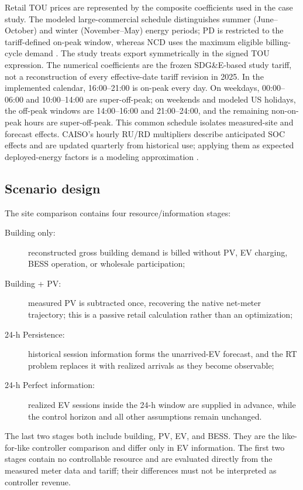 \documentclass[final,5p,times]{elsarticle}
\begin{document}
Retail TOU prices are represented by the composite coefficients used in the
case study. The modeled large-commercial schedule distinguishes summer
(June--October) and winter (November--May) energy periods; PD is restricted to
the tariff-defined on-peak window, whereas NCD uses the maximum eligible
billing-cycle demand \cite{sdgeLargeCommercial2025} \cite{sdgeDemandGuide2026}. The
study treats export symmetrically in the signed TOU expression. The numerical
coefficients are the frozen SDG\&E-based study tariff, not a reconstruction of
every effective-date tariff revision in 2025. In the implemented calendar,
16:00--21:00 is on-peak every day. On weekdays, 00:00--06:00 and 10:00--14:00
are super-off-peak; on weekends and modeled US holidays, the off-peak windows
are 14:00--16:00 and 21:00--24:00, and the remaining non-on-peak hours are
super-off-peak. This common schedule isolates measured-site and forecast effects.
CAISO's hourly RU/RD multipliers describe anticipated SOC effects and are
updated quarterly from historical use; applying them as expected deployed-energy
factors is a modeling approximation \cite{caisoAttenuation2025}. 

\subsection{Scenario design}
The site comparison contains four resource/information stages:
\begin{description}
  \item[Building only:] reconstructed gross building demand is billed without PV, EV charging, BESS operation, or wholesale participation;
  \item[Building + PV:] measured PV is subtracted once, recovering the native net-meter trajectory; this is a passive retail calculation rather than an optimization;
  \item[24-h Persistence:] historical session information forms the unarrived-EV forecast, and the RT problem replaces it with realized arrivals as they become observable;
  \item[24-h Perfect information:] realized EV sessions inside the 24-h window are supplied in advance, while the control horizon and all other assumptions remain unchanged.
\end{description}
The last two stages both include building, PV, EV, and BESS. They are the like-for-like controller comparison and differ only in EV information. The first two stages contain no controllable resource and are evaluated directly from the measured meter data and tariff; their differences must not be interpreted as controller revenue.
\end{document}
